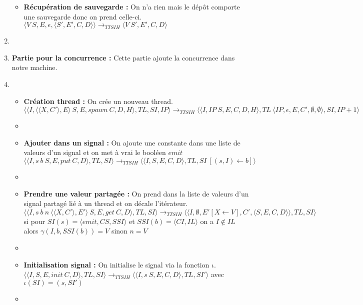 \documentclass[10pt,a4paper]{report}
\begin{document}
\begin{enumerate}
\begin{itemize}
			\item[] \textbf{Récupération de sauvegarde :}  On n'a rien mais le dépôt comporte une sauvegarde donc on prend celle-ci.
			\smallbreak  
			$\langle V~S,E,\epsilon,\langle S',E',C,D\rangle\rangle
			\longrightarrow_{TTSIH} 
			\langle V~S',E',C,D\rangle$
		\end{itemize}
		\item[]
		
		
		
		\item[] \textbf{Partie pour la concurrence :} Cette partie ajoute la concurrence dans notre machine. 
		\item[]
		\begin{itemize}
			\item[]  \textbf{Création thread :} On crée un nouveau thread.
			\smallbreak 
			$\langle\langle I,\langle\langle X,C'\rangle, E\rangle~S,E,spawn~C,D,H\rangle,TL,SI,IP\rangle 
			\longrightarrow_{TTSIH} 
			\langle\langle I,IP~S,E,C,D,H\rangle,TL~\langle IP,\epsilon,E,C',\emptyset,\emptyset\rangle,SI,IP+1\rangle$
			\item[]
			
			\item[] \textbf{Ajouter dans un signal :} On ajoute une constante dans une liste de valeurs d'un signal et on met à vrai le booléen $emit$
			\smallbreak
			$\langle\langle I,s~b~S,E,put~C,D\rangle,TL,SI\rangle
			\longrightarrow_{TTSIH} 
			\langle\langle I,S,E,C,D\rangle,TL,SI~[(s,I) \leftarrow b]\rangle$ 
			\item[]
			
			\item[] \textbf{Prendre une valeur partagée :} On prend dans la liste de valeurs d'un signal partagé lié à un thread et on décale l'itérateur.
			\smallbreak
			$\langle\langle I,s~b~n~\langle\langle X,C'\rangle,E'\rangle~S,E,get~C,D\rangle,TL,SI\rangle 
			\longrightarrow_{TTSIH} 
			\langle\langle I,\emptyset,E'[X \leftarrow V],C',\langle S,E,C,D\rangle\rangle,TL,SI\rangle$
			\\ si pour $SI(s) = \langle emit,CS,SSI\rangle$ et $SSI(b) = \langle CI,IL\rangle$ on a $I \notin IL$ alors $\gamma(I,b,SSI(b)) = V$ sinon $n = V$
			\item[]
			
			\item[] \textbf{Initialisation signal :} On initialise le signal via la fonction $\iota$.
			\smallbreak 
			$\langle\langle I,S,E,init~C,D\rangle,TL,SI\rangle 
			\longrightarrow_{TTSIH}
			\langle\langle I,s~S,E,C,D\rangle,TL,SI'\rangle$
			avec $\iota(SI) = (s,SI')$
			\item[]	
			

\end{itemize}
\end{enumerate}
\end{document}
